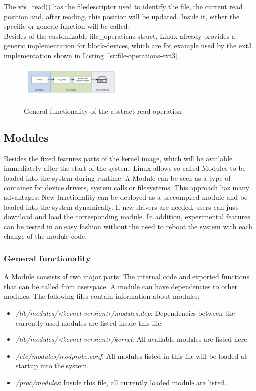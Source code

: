 \documentclass{sig-alternate-05-2015}
\begin{document}
 The vfs\_read() has the filedescriptor used to identify the file, the current read position and, after reading, this position will be updated. Inside it, either the specific or generic function will be called.\\
Besides of the customizable file\_operations struct, Linux already provides a generic implementation for block-devices, which are for example used by the ext3 implementation shown in Listing \ref{lst:file-operations-ext3}. 


\begin{figure}
\centering
\includegraphics[width= 0.45\textwidth ]{img/vfs-read-abstraction.pdf}
\label{fig:vfs-read-abstraction}
\caption{General functionality of the abstract read operation}
\end{figure}

\subsection{Modules}
\label{chap:mods}
Besides the fixed features parts of the kernel image, which will be available immediately after the start of the system, Linux allows so called Modules to be loaded into the system during runtime. A Module can be seen as a type of container for device drivers, system calls or filesystems.
This approach has many advantages: New functionality can be deployed as a precompiled module and be loaded into the system dynamically. If new drivers are needed, users can just download and load the corresponding module. In addition, experimental features can be tested in an easy fashion without the need to reboot the system with each change of the module code.
\subsubsection{General functionality}
A Module consists of two major parts: The internal code and exported functions that can be called from userspace. A module can have dependencies to other modules. 
The following files contain information about modules:
\begin{itemize}
\item \emph{/lib/modules/<kernel version>/modules.dep}: Dependencies  between the currently used modules are listed inside this file.
\item \emph{/lib/modules/<kernel version>/kernel}: All available modules are listed here.
\item \emph{/etc/modules/modprobe.conf}: All modules listed in this file will be loaded at startup into the system.
\item \emph{/proc/modules}: Inside this file, all currently loaded module are listed.
\end{itemize}
\end{document}
